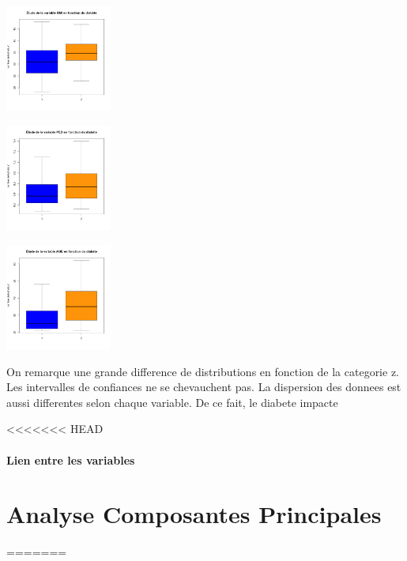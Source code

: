 \documentclass[]{report}
\begin{document}
\begin{center}
\begin{minipage}[t]{0.3\textwidth}
	\end{minipage}
	\begin{minipage}[t]{0.3\textwidth}
		\includegraphics[width=35mm]{Figures/Pima/bxp_z_bmi.png}
	\end{minipage}
	\newline
	\begin{minipage}[t]{0.3\textwidth}
		\includegraphics[width=35mm]{Figures/Pima/bxp_z_ped.png}
	\end{minipage}
	\begin{minipage}[t]{0.3\textwidth}
		\includegraphics[width=35mm]{Figures/Pima/bxp_z_age.png}
	\end{minipage}
\end{center}

On remarque une grande difference de distributions en fonction de la categorie z. Les intervalles de confiances ne se chevauchent pas. La dispersion des donnees est aussi differentes selon chaque variable. De ce fait, le diabete impacte 

<<<<<<< HEAD
\subsubsection{Lien entre les variables}


\chapter{Analyse Composantes Principales}
=======
\end{document}
